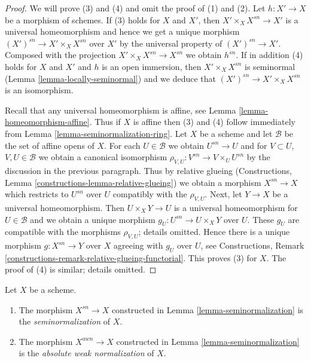 \begin{proof}
We will prove (3) and (4) and omit the proof of (1) and (2).
Let $h : X' \to X$ be a morphism of schemes. If (3) holds for $X$
and $X'$, then $X' \times_X X^{sn} \to X'$ is a universal homeomorphism
and hence we get a unique morphism $(X')^{sn} \to X' \times_X X^{sn}$
over $X'$ by the universal property of $(X')^{sn} \to X'$. Composed with the
projection $X' \times_X X^{sn} \to X^{sn}$ we obtain $h^{sn}$.
If in addition (4) holds for $X$ and $X'$
and $h$ is an open immersion, then $X' \times_X X^{sn}$ is seminormal
(Lemma \ref{lemma-locally-seminormal}) and we deduce that
$(X')^{sn} \to X' \times_X X^{sn}$ is an isomorphism.

\medskip\noindent
Recall that any universal homeomorphism is affine, see
Lemma \ref{lemma-homeomorphism-affine}. Thus if $X$ is affine
then (3) and (4) follow immediately from
Lemma \ref{lemma-seminormalization-ring}.
Let $X$ be a scheme and let $\mathcal{B}$ be the set of affine opens
of $X$. For each $U \in \mathcal{B}$ we obtain $U^{sn} \to U$
and for $V \subset U$, $V, U \in \mathcal{B}$ we obtain a canonical
isomorphism $\rho_{V, U} : V^{sn} \to V \times_U U^{sn}$ by the discussion
in the previous paragraph. Thus by relative glueing
(Constructions, Lemma \ref{constructions-lemma-relative-glueing})
we obtain a morphism $X^{sn} \to X$ which restricts
to $U^{sn}$ over $U$ compatibly with the $\rho_{V, U}$.
Next, let $Y \to X$ be a universal homeomorphism.
Then $U \times_X Y \to U$ is a universal homeomorphism for $U \in \mathcal{B}$
and we obtain a unique morphism $g_U : U^{sn} \to U \times_X Y$ over $U$.
These $g_U$ are compatible with the morphisms $\rho_{V, U}$; details
omitted. Hence there is a unique morphism $g : X^{sn} \to Y$
over $X$ agreeing with $g_U$ over $U$, see
Constructions, Remark \ref{constructions-remark-relative-glueing-functorial}.
This proves (3) for $X$. The proof of (4) is similar; details omitted.
\end{proof}

\begin{definition}
\label{definition-seminormalization}
Let $X$ be a scheme.
\begin{enumerate}
\item The morphism $X^{sn} \to X$ constructed in
Lemma \ref{lemma-seminormalization}
is the {\it seminormalization} of $X$.
\item The morphism $X^{awn} \to X$ constructed in
Lemma \ref{lemma-seminormalization}
is the {\it absolute weak normalization} of $X$.
\end{enumerate}
\end{definition}

